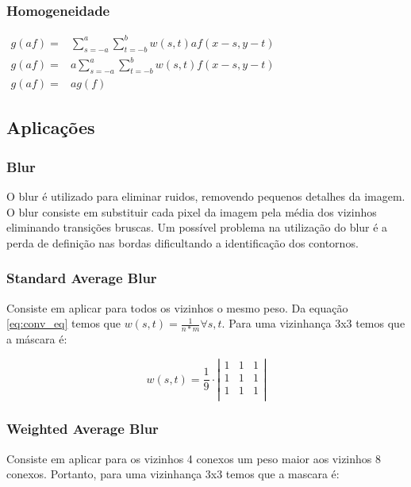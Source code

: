 \documentclass[10pt,a4paper]{article}
\begin{document}
\subsubsection{Homogeneidade}
\begin{center}
$\begin{aligned}
    g(a f) = &\sum_{s = -a}^{a}\sum_{t = -b}^{b}w(s,t) a f(x - s, y - t) \\
    g(a f) = &a \sum_{s = -a}^{a}\sum_{t = -b}^{b}w(s,t) f(x - s, y - t) \\
    g(a f) = &a g(f)
\end{aligned}$
\end{center}

\newpage

\subsection{Aplicações}
\subsubsection{Blur}
O blur é utilizado para eliminar ruidos, removendo pequenos detalhes da imagem. O blur consiste em substituir cada pixel da imagem pela média dos vizinhos eliminando transições bruscas. Um possível problema na utilização do blur é a perda de definição nas bordas dificultando a identificação dos contornos.

\subsubsection*{Standard Average Blur}
Consiste em aplicar para todos os vizinhos o mesmo peso. Da equação \ref{eq:conv_eq} temos que $w(s,t) = \frac{1}{n * m} \forall s,t$. Para uma vizinhança 3x3 temos que a máscara é:

\[ w(s,t) = \frac{1}{9} \cdot \left|
\begin{array}{ccc}
1 & 1 & 1 \\
1 & 1 & 1 \\
1 & 1 & 1 \\
\end{array}\right|\]

\subsubsection*{Weighted Average Blur}
Consiste em aplicar para os vizinhos 4 conexos um peso maior aos vizinhos 8 conexos. Portanto, para uma vizinhança 3x3 temos que a mascara é:
\end{document}
